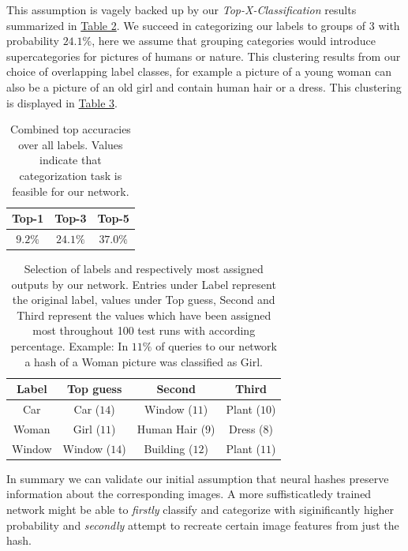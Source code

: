 \documentclass[10pt,twocolumn,letterpaper]{article}
\newcommand{\rref}[1]{\hyperref[ref:#1]{\text{[#1]}}}
\begin{document}
This assumption is vagely backed up by our \textit{Top-X-Classification} results summarized in \hyperref[tab:two]{Table 2}. We succeed in categorizing our labels to groups of $3$ with probability $24.1\%$, here we assume that grouping categories would introduce supercategories for pictures of humans or nature. This clustering results from our choice of overlapping label classes, for example a picture of a young woman can also be a picture of an old girl and contain human hair or a dress. This clustering is displayed in \hyperref[tab:three]{Table 3}.

\begin{table}
  \centering
  \begin{tabular}{@{}ccc@{}}
    \toprule
    \textbf{Top-1} & \textbf{Top-3} & \textbf{Top-5} \\
    \midrule
    $9.2\%$ & $24.1\%$ & $37.0\%$  \\
    \bottomrule
  \end{tabular}
  \caption{Combined top accuracies over all labels. Values indicate that categorization task is feasible for our network.}
  \label{tab:two}
\end{table}

\begin{table}
  \centering
  \begin{tabular}{@{}c|ccc@{}}
    \toprule
    \textbf{Label} & \textbf{Top guess} & \textbf{Second} & \textbf{Third} \\
    \midrule
     Car & Car ($14$) & Window ($11$) & Plant ($10$) \\
     Woman & Girl ($11$) & Human Hair ($9$) & Dress ($8$) \\
     Window & Window ($14$) & Building ($12$) & Plant ($11$) \\
    \bottomrule
  \end{tabular}
  \caption{Selection of labels and respectively most assigned outputs by our network. Entries under Label represent the original label, values under Top guess, Second and Third represent the values which have been assigned most throughout 100 test runs with according percentage. Example: In $11\%$ of queries to our network a hash of a Woman picture was classified as Girl.}
  \label{tab:three}
\end{table}

In summary we can validate our initial assumption that neural hashes preserve information about the corresponding images. A more suffisticatledy trained network might be able to \textit{firstly} classify and categorize with siginificantly higher probability \rref{2} and \textit{secondly} attempt to recreate certain image features from just the hash. 
\end{document}
